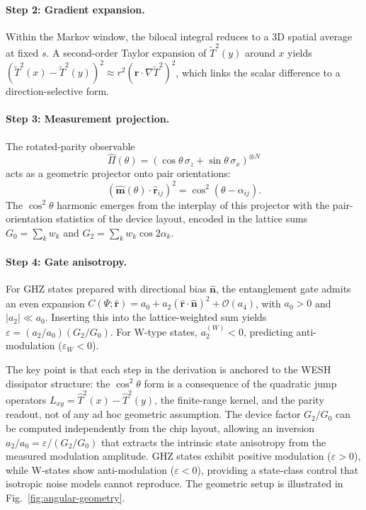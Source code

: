 \documentclass[12pt,a4paper]{article}
\numberwithin{equation}{section}
\begin{document}
\paragraph{Step 2: Gradient expansion.}
Within the Markov window, the bilocal integral reduces to a 3D spatial average at fixed $s$. A second-order Taylor expansion of $\tilde{T}^2(y)$ around $x$ yields $(\tilde{T}^2(x)-\tilde{T}^2(y))^2 \approx r^2(\hat{\mathbf r}\cdot\nabla\tilde{T}^2)^2$, which links the scalar difference to a direction-selective form.

\paragraph{Step 3: Measurement projection.}
The rotated-parity observable
\begin{equation*}
\hat\Pi(\theta) = (\cos\theta\,\sigma_z + \sin\theta\,\sigma_x)^{\otimes N}
\end{equation*}
acts as a geometric projector onto pair orientations:
\begin{equation*}
(\hat{\mathbf m}(\theta)\cdot\hat{\mathbf r}_{ij})^2 = \cos^2(\theta - \alpha_{ij}).
\end{equation*}
The $\cos^2\theta$ harmonic emerges from the interplay of this projector with the pair-orientation statistics of the device layout, encoded in the lattice sums $G_0 = \sum_k w_k$ and $G_2 = \sum_k w_k\cos 2\alpha_k$.

\paragraph{Step 4: Gate anisotropy.}
For GHZ states prepared with directional bias $\hat{\mathbf n}$, the entanglement gate admits an even expansion $C(\Psi;\hat{\mathbf r}) = a_0 + a_2(\hat{\mathbf r}\cdot\hat{\mathbf n})^2 + \mathcal{O}(a_4)$, with $a_0 > 0$ and $|a_2|\ll a_0$. Inserting this into the lattice-weighted sum yields $\varepsilon = (a_2/a_0)(G_2/G_0)$. For W-type states, $a_2^{(W)} < 0$, predicting anti-modulation ($\varepsilon_W < 0$).

\medskip
\noindent The key point is that each step in the derivation is anchored to the WESH dissipator structure: the $\cos^2\theta$ form is a consequence of the quadratic jump operators $L_{xy} = \hat{T}^2(x) - \hat{T}^2(y)$, the finite-range kernel, and the parity readout, not of any ad hoc geometric assumption. The device factor $G_2/G_0$ can be computed independently from the chip layout, allowing an inversion $a_2/a_0 = \varepsilon/(G_2/G_0)$ that extracts the intrinsic state anisotropy from the measured modulation amplitude. GHZ states exhibit positive modulation ($\varepsilon > 0$), while W-states show anti-modulation ($\varepsilon < 0$), providing a state-class control that isotropic noise models cannot reproduce. The geometric setup is illustrated in Fig.~\ref{fig:angular-geometry}.
\vspace{0.3cm}
\end{document}
